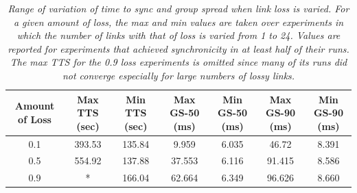 \begin{table}[t]
\begin{center}
\begin{tabular}{|c|c|c|c|c|c|c|} \hline
Amount of Loss & Max TTS (sec) & Min TTS (sec) & Max GS-50 (ms) & Min GS-50 (ms) & Max GS-90 (ms) & Min GS-90 (ms) \\ \hline \hline
0.1            &  393.53     &  135.84       &  9.959      &  6.035    &   46.72    & 8.391  \\ 
0.5            &  554.92     &  137.88       &  37.553     &  6.116    &   91.415   & 8.586  \\
0.9            &  *          &  166.04       &  62.664     &  6.349    &   96.626   & 8.660  \\
\hline \hline
\end{tabular}
\end{center}
\caption{{\it Range of variation of time to sync and group spread when link loss is varied. For a given amount of loss, the max and min values are taken over experiments in which the number of links with that of loss is varied from 1 to 24.  Values are reported for experiments that achieved synchronicity in at least half of their runs.  The max TTS for the 0.9 loss experiments is omitted since many of its runs did not converge especially for large numbers of lossy links.}}
\label{table:maxMin}
\end{table}

